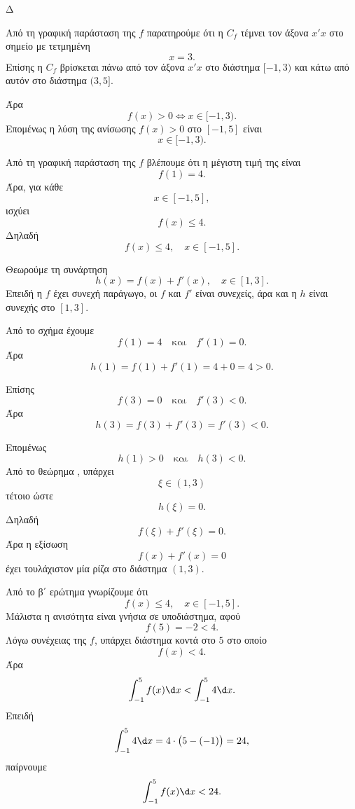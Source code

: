 \begin{thema}{Δ}
\begin{erwthma}
\item Από τη γραφική παράσταση της $f$ παρατηρούμε ότι η $C_f$ τέμνει
τον άξονα $x'x$ στο σημείο με τετμημένη
\[
x=3.
\]
Επίσης η $C_f$ βρίσκεται πάνω από τον άξονα $x'x$ στο διάστημα
$[-1,3)$ και κάτω από αυτόν στο διάστημα $(3,5]$.

Άρα
\[
f(x)>0
\Leftrightarrow
x\in[-1,3).
\]
Επομένως η λύση της ανίσωσης $f(x)>0$ στο $[-1,5]$ είναι
\[
{x\in[-1,3)}.
\]

\item Από τη γραφική παράσταση της $f$ βλέπουμε ότι η μέγιστη τιμή της
είναι
\[
f(1)=4.
\]
Άρα, για κάθε
\[
x\in[-1,5],
\]
ισχύει
\[
f(x)\leq 4.
\]
Δηλαδή
\[
{f(x)\leq 4,\quad x\in[-1,5]}.
\]

\item Θεωρούμε τη συνάρτηση
\[
h(x)=f(x)+f'(x),\quad x\in[1,3].
\]
Επειδή η $f$ έχει συνεχή παράγωγο, οι $f$ και $f'$ είναι συνεχείς, άρα
και η $h$ είναι συνεχής στο $[1,3]$.

Από το σχήμα έχουμε
\[
f(1)=4
\quad\text{και}\quad
f'(1)=0.
\]
Άρα
\[
h(1)=f(1)+f'(1)=4+0=4>0.
\]

Επίσης
\[
f(3)=0
\quad\text{και}\quad
f'(3)<0.
\]
Άρα
\[
h(3)=f(3)+f'(3)=f'(3)<0.
\]

Επομένως
\[
h(1)>0
\quad\text{και}\quad
h(3)<0.
\]
Από το θεώρημα , υπάρχει
\[
\xi\in(1,3)
\]
τέτοιο ώστε
\[
h(\xi)=0.
\]
Δηλαδή
\[
f(\xi)+f'(\xi)=0.
\]
Άρα η εξίσωση
\[
f(x)+f'(x)=0
\]
έχει τουλάχιστον μία ρίζα στο διάστημα $(1,3)$.

\item Από το β΄ ερώτημα γνωρίζουμε ότι
\[
f(x)\leq 4,\quad x\in[-1,5].
\]
Μάλιστα η ανισότητα είναι γνήσια σε υποδιάστημα, αφού
\[
f(5)=-2<4.
\]
Λόγω συνέχειας της $f$, υπάρχει διάστημα κοντά στο $5$ στο οποίο
\[
f(x)<4.
\]
Άρα
\[
\int_{-1}^{5} f(x)\d x
<
\int_{-1}^{5} 4\d x.
\]
Επειδή
\[
\int_{-1}^{5}4\d x=4\cdot\bigl(5-(-1)\bigr)=24,
\]
παίρνουμε
\[
{\int_{-1}^{5} f(x)\d x<24}.
\]
\end{erwthma}
\end{thema}

